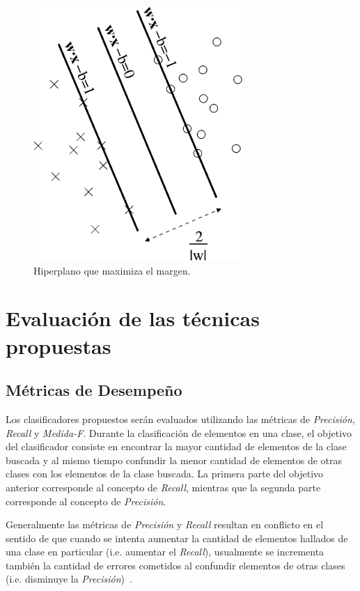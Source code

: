 \documentclass[runningheads,a4paper]{llncs}
\begin{document}
\begin{figure}[ht]
	\centering
	\includegraphics[scale=0.6]{svm.png}
	\caption{Hiperplano que maximiza el margen.}
	\label{fig:SVM}
\end{figure}

\section{Evaluación de las técnicas propuestas}
\label{sec:Resultados}

\subsection{Métricas de Desempeño}
\label{sec:metricas}
Los clasificadores propuestos serán evaluados utilizando las métricas de \emph{Precisión}, \emph{Recall} y \emph{Medida-F}. Durante la clasificación de elementos en una clase, el objetivo del clasificador consiste en encontrar la mayor cantidad de elementos de la clase buscada y al mismo tiempo confundir la menor cantidad de elementos de otras clases con los elementos de la clase buscada. La primera parte del objetivo anterior corresponde al concepto de \emph{Recall}, mientras que la segunda parte corresponde al concepto de \emph{Precisi\'on}.

Generalmente las métricas de \emph{Precisión} y \emph{Recall} resultan en conflicto en el sentido de que cuando se intenta aumentar la cantidad de elementos hallados de una clase en particular (i.e. aumentar el \emph{Recall}), usualmente se incrementa también la cantidad de errores cometidos al confundir elementos de otras clases (i.e. disminuye la \emph{Precisión})~\cite{RAGHAVAN89}.
\end{document}
